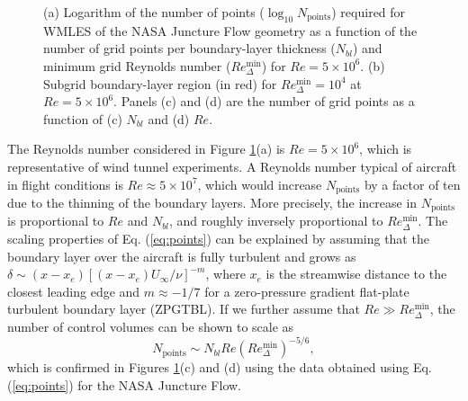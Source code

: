 \documentclass{ctr}
\begin{document}
\begin{figure}
  \begin{center}
    \hspace{0.3cm}
\end{center}
  \begin{center}
        \hspace{0.1cm}
\end{center}
\caption{ (a) Logarithm of the number of points
  ($\log_{10}N_\mathrm{points}$) required for WMLES of the NASA
  Juncture Flow geometry as a function of the number of grid points
  per boundary-layer thickness ($N_{bl}$) and minimum grid Reynolds
  number ($Re_\Delta^\mathrm{min}$) for $Re = 5 \times 10^6$. (b)
  Subgrid boundary-layer region (in red) for $Re_\Delta^\mathrm{min} =
  10^4$ at $Re = 5 \times 10^6$. Panels (c) and (d) are the number of
  grid points as a function of (c) $N_{bl}$ and (d)
  $Re$.\label{fig:cost}}
\end{figure}

The Reynolds number considered in Figure \ref{fig:cost}(a) is $Re=5
\times 10^6$, which is representative of wind tunnel experiments. A
Reynolds number typical of aircraft in flight conditions is
$Re\approx5 \times 10^7$, which would increase $N_\mathrm{points}$ by
a factor of ten due to the thinning of the boundary layers.  More
precisely, the increase in $N_\mathrm{points}$ is proportional to $Re$
and $N_{bl}$, and roughly inversely proportional to
$Re_\Delta^\mathrm{min}$.  The scaling properties of
Eq. (\ref{eq:points}) can be explained by assuming that the boundary
layer over the aircraft is fully turbulent and grows as $\delta \sim
(x-x_e)[(x-x_e)U_\infty/\nu]^{-m}$, where $x_e$ is the streamwise
distance to the closest leading edge and $m\approx-1/7$ for a zero-pressure
gradient flat-plate turbulent boundary layer (ZPGTBL). If we further
assume that $Re \gg Re_\Delta^\mathrm{min}$, the number of control
volumes can be shown to scale as
%
\begin{equation}\label{eq:growth}
N_\mathrm{points} \sim N_{bl} Re \left( Re_\Delta^\mathrm{min} \right)^{-5/6},
\end{equation}
which is confirmed in Figures \ref{fig:cost}(c) and (d) using the data
obtained using Eq. (\ref{eq:points}) for the NASA Juncture Flow.
\end{document}
